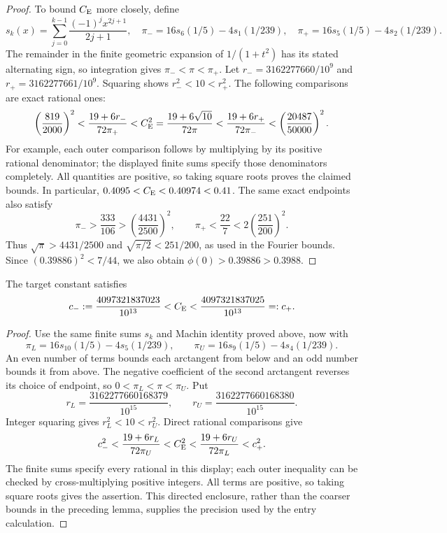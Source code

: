\begin{proof}
To bound $C_{\mathrm E}$ more closely, define
\[
 s_k(x)=\sum_{j=0}^{k-1}\frac{(-1)^jx^{2j+1}}{2j+1},\quad
 \pi_-=16s_6(1/5)-4s_1(1/239),\quad
 \pi_+=16s_5(1/5)-4s_2(1/239).
\]
The remainder in the finite geometric expansion of $1/(1+t^2)$ has its
stated alternating sign, so integration gives $\pi_-<\pi<\pi_+$.
Let $r_-=3162277660/10^9$ and $r_+=3162277661/10^9$. Squaring shows
$r_-^2<10<r_+^2$. The following comparisons are exact rational ones:
\[
 \left(\frac{819}{2000}\right)^2
 <\frac{19+6r_-}{72\pi_+}
 <C_{\mathrm E}^2=\frac{19+6\sqrt{10}}{72\pi}
 <\frac{19+6r_+}{72\pi_-}
 <\left(\frac{20487}{50000}\right)^2.
\]
For example, each outer comparison follows by multiplying by its positive
rational denominator; the displayed finite sums specify those denominators
completely. All quantities are positive, so taking square roots proves the
claimed bounds. In particular, $0.4095<C_{\mathrm E}<0.40974<0.41$.
The same exact endpoints also satisfy
\[
 \pi_->\frac{333}{106}>\left(\frac{4431}{2500}\right)^2,
 \qquad \pi_+<\frac{22}{7}<2\left(\frac{251}{200}\right)^2.
\]
Thus $\sqrt\pi>4431/2500$ and $\sqrt{\pi/2}<251/200$,
as used in the Fourier bounds.
Since $(0.39886)^2<7/44$, we also obtain
$\phi(0)>0.39886>0.3988$.
\end{proof}

\begin{lemma}\label{ms:narrow-constant}
The target constant satisfies
\[
 c_-:=\frac{4097321837023}{10^{13}}<C_{\mathrm E}
 <\frac{4097321837025}{10^{13}}=:c_+.
\]
\end{lemma}
\begin{proof}
Use the same finite sums $s_k$ and Machin identity proved above, now with
\[
 \pi_L=16s_{10}(1/5)-4s_5(1/239),\qquad
 \pi_U=16s_9(1/5)-4s_4(1/239).
\]
An even number of terms bounds each arctangent from below and an odd
number bounds it from above. The negative coefficient of the second
arctangent reverses its choice of endpoint, so
$0<\pi_L<\pi<\pi_U$. Put
\[
 r_L=\frac{3162277660168379}{10^{15}},\qquad
 r_U=\frac{3162277660168380}{10^{15}}.
\]
Integer squaring gives $r_L^2<10<r_U^2$. Direct rational comparisons give
\[
 c_-^2<\frac{19+6r_L}{72\pi_U}
 <C_{\mathrm E}^2
 <\frac{19+6r_U}{72\pi_L}<c_+^2.
\]
The finite sums specify every rational in this display; each outer
inequality can be checked by cross-multiplying positive integers.
All terms are positive, so taking square roots gives the assertion.
This directed enclosure, rather than the coarser bounds in the preceding
lemma, supplies the precision used by the entry calculation.
\end{proof}
